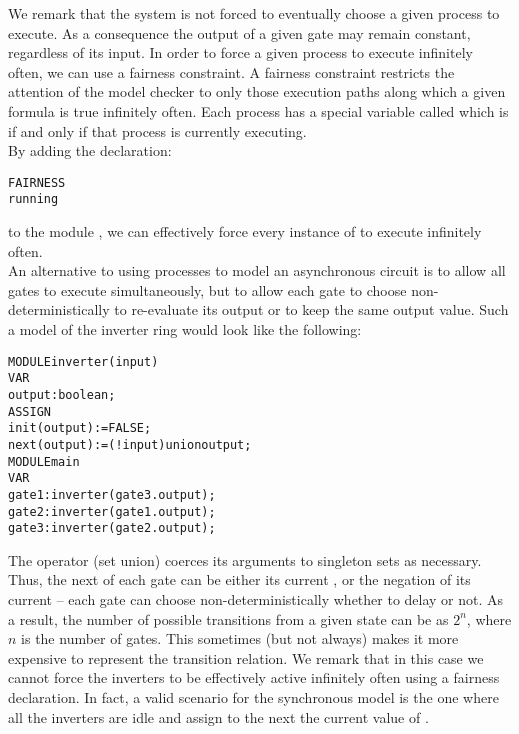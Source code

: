 We remark that the system is not forced to eventually choose a given
process to execute. As a consequence the output of a given gate may remain
constant, regardless of its input.
In order to force a given process to execute infinitely often, we can
use a fairness constraint. 
A fairness constraint restricts the attention of the model checker to
only those execution paths along which a given formula is true
infinitely often. Each process has a special variable called
 which is  if and only if that process is
currently executing.\\
By adding the declaration:\\
\begin{alltt}
FAIRNESS
  running
\end{alltt}
to the module , we can effectively force every
instance of  to execute infinitely often.\\
An alternative to using processes to model an asynchronous circuit
is to allow all gates to execute simultaneously, but to allow each gate
to choose non-deterministically to re-evaluate its output or to keep the
same output value. Such a model of the inverter ring would look like the
following:\\
\begin{alltt}
MODULE inverter(input)
 VAR
   output : boolean;
 ASSIGN
  init(output) := FALSE;
  next(output) := (!input) union output;
MODULE main
 VAR
   gate1 : inverter(gate3.output);
   gate2 : inverter(gate1.output);
   gate3 : inverter(gate2.output);
\end{alltt}
The  operator (set union) coerces its arguments to
singleton sets as necessary. Thus, the next  of each gate
can be either its current , or the negation of its
current  -- each gate can choose non-deterministically
whether to delay or not. As a result, the number of possible
transitions from a given state can be as $2^n$,
where $n$ is the number of gates. This sometimes (but not always)
makes it more expensive to represent the transition relation.
We remark that in this case we cannot force the inverters to be
effectively active infinitely often using a fairness declaration. In
fact, a valid scenario for the synchronous model is the one where all
the inverters are idle and assign to the next  the current
value of .

